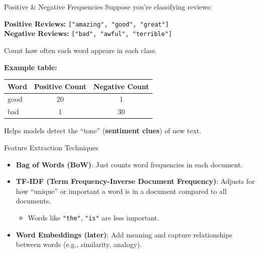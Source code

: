 \begin{frame}{Positive \& Negative Frequencies}
    Suppose you're classifying reviews:

    \vspace{0.5em}
    \textbf{Positive Reviews:} \texttt{["amazing", "good", "great"]} \\
    \textbf{Negative Reviews:} \texttt{["bad", "awful", "terrible"]}

    \vspace{1em}
    Count how often each word appears in each class.

    \vspace{1em}
    \textbf{Example table:}
    \begin{table}[ht]
        \centering
        \renewcommand{\arraystretch}{1.5}
        \begin{tabular}{lcc}
            \toprule
            \textbf{Word} & \textbf{Positive Count} & \textbf{Negative Count} \\
            \midrule
            good & 20 & 1 \\
            bad & 1 & 30 \\
            \bottomrule
        \end{tabular}
    \end{table}

    \vspace{0.5em}
    Helps models detect the “tone” (\textbf{sentiment clues}) of new text.
\end{frame}

\begin{frame}{Feature Extraction Techniques}
    \begin{itemize}
        \item \textbf{Bag of Words (BoW)}: Just counts word frequencies in each document.
        \item \textbf{TF-IDF (Term Frequency-Inverse Document Frequency)}: Adjusts for how “unique” or important a word is in a document compared to all documents.
        \begin{itemize}
            \item Words like \texttt{"the"}, \texttt{"is"} are less important.
        \end{itemize}
        \item \textbf{Word Embeddings (later)}: Add meaning and capture relationships between words (e.g., similarity, analogy).
    \end{itemize}
\end{frame}